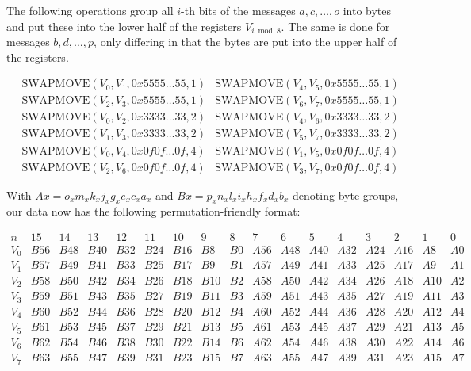 The following operations group all $i$-th bits of the messages $a,c,\dots,o$
into bytes and put these into the lower half of the registers $V_{i\bmod 8}$.
The same is done for messages $b,d,\dots,p$, only differing in that the bytes
are put into the upper half of the registers.

\begin{align*}
    &\text{SWAPMOVE}(V_0,V_1,0x5555\dots 55,1) &\text{SWAPMOVE}(V_4,V_5,0x5555\dots 55,1) \\
    &\text{SWAPMOVE}(V_2,V_3,0x5555\dots 55,1) &\text{SWAPMOVE}(V_6,V_7,0x5555\dots 55,1) \\
    &\text{SWAPMOVE}(V_0,V_2,0x3333\dots 33,2) &\text{SWAPMOVE}(V_4,V_6,0x3333\dots 33,2) \\
    &\text{SWAPMOVE}(V_1,V_3,0x3333\dots 33,2) &\text{SWAPMOVE}(V_5,V_7,0x3333\dots 33,2) \\
    &\text{SWAPMOVE}(V_0,V_4,0x0f0f\dots 0f,4) &\text{SWAPMOVE}(V_1,V_5,0x0f0f\dots 0f,4) \\
    &\text{SWAPMOVE}(V_2,V_6,0x0f0f\dots 0f,4) &\text{SWAPMOVE}(V_3,V_7,0x0f0f\dots 0f,4)
\end{align*}

With $Ax=o_xm_xk_xj_xg_xe_xc_xa_x$ and $Bx=p_xn_xl_xi_xh_xf_xd_xb_x$ denoting
byte groups, our data now has the following permutation-friendly format:

\scriptsize
\[
    \begin{array}{c|llllllll|llllllll}
        n & 15 & 14 & 13 & 12 & 11 & 10 & 9 & 8 & 7 & 6 & 5 & 4 & 3 & 2 & 1 & 0 \\
        \hline
        V_0 & B56 & B48 & B40 & B32 & B24 & B16 & B8  & B0 & A56 & A48 & A40 & A32 & A24 & A16 & A8  & A0 \\
        V_1 & B57 & B49 & B41 & B33 & B25 & B17 & B9  & B1 & A57 & A49 & A41 & A33 & A25 & A17 & A9  & A1 \\
        V_2 & B58 & B50 & B42 & B34 & B26 & B18 & B10 & B2 & A58 & A50 & A42 & A34 & A26 & A18 & A10 & A2 \\
        V_3 & B59 & B51 & B43 & B35 & B27 & B19 & B11 & B3 & A59 & A51 & A43 & A35 & A27 & A19 & A11 & A3 \\
        V_4 & B60 & B52 & B44 & B36 & B28 & B20 & B12 & B4 & A60 & A52 & A44 & A36 & A28 & A20 & A12 & A4 \\
        V_5 & B61 & B53 & B45 & B37 & B29 & B21 & B13 & B5 & A61 & A53 & A45 & A37 & A29 & A21 & A13 & A5 \\
        V_6 & B62 & B54 & B46 & B38 & B30 & B22 & B14 & B6 & A62 & A54 & A46 & A38 & A30 & A22 & A14 & A6 \\
        V_7 & B63 & B55 & B47 & B39 & B31 & B23 & B15 & B7 & A63 & A55 & A47 & A39 & A31 & A23 & A15 & A7
    \end{array}
\]
\normalsize

